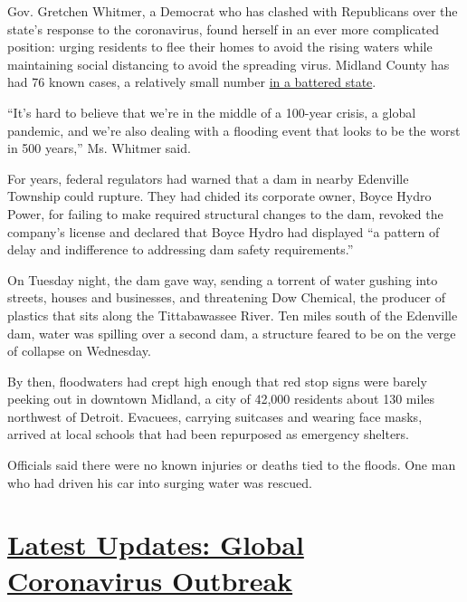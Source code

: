 Gov. Gretchen Whitmer, a Democrat who has clashed with Republicans over
the state's response to the coronavirus, found herself in an ever more
complicated position: urging residents to flee their homes to avoid the
rising waters while maintaining social distancing to avoid the spreading
virus. Midland County has had 76 known cases, a relatively small number
\href{https://www.nytimes.com/2020/03/30/us/coronavirus-detroit.html}{in
a battered state}.

``It's hard to believe that we're in the middle of a 100-year crisis, a
global pandemic, and we're also dealing with a flooding event that looks
to be the worst in 500 years,'' Ms. Whitmer said.

For years, federal regulators had warned that a dam in nearby Edenville
Township could rupture. They had chided its corporate owner, Boyce Hydro
Power, for failing to make required structural changes to the dam,
revoked the company's license and declared that Boyce Hydro had
displayed ``a pattern of delay and indifference to addressing dam safety
requirements.''

On Tuesday night, the dam gave way, sending a torrent of water gushing
into streets, houses and businesses, and threatening Dow Chemical, the
producer of plastics that sits along the Tittabawassee River. Ten miles
south of the Edenville dam, water was spilling over a second dam, a
structure feared to be on the verge of collapse on Wednesday.

By then, floodwaters had crept high enough that red stop signs were
barely peeking out in downtown Midland, a city of 42,000 residents about
130 miles northwest of Detroit. Evacuees, carrying suitcases and wearing
face masks, arrived at local schools that had been repurposed as
emergency shelters.

Officials said there were no known injuries or deaths tied to the
floods. One man who had driven his car into surging water was rescued.

\hypertarget{latest-updates-global-coronavirus-outbreak}{%
\section{\texorpdfstring{\href{https://www.nytimes.com/2020/08/04/world/coronavirus-cases.html?action=click\&pgtype=Article\&state=default\&region=MAIN_CONTENT_1\&context=storylines_live_updates}{Latest
Updates: Global Coronavirus
Outbreak}}{Latest Updates: Global Coronavirus Outbreak}}\label{latest-updates-global-coronavirus-outbreak}}

